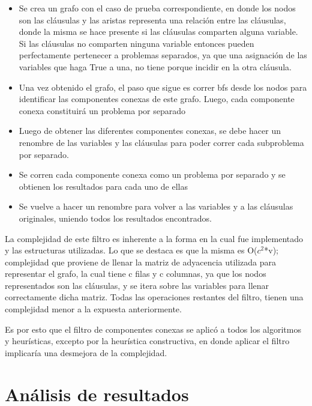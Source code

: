 \documentclass[a4paper,10pt]{article}
\begin{document}
\begin{itemize}
\item Se crea un grafo con el caso de prueba correspondiente, en donde los nodos son las cl\'ausulas y las aristas representa una relaci\'on entre las cl\'ausulas, donde la misma se hace presente si las cl\'ausulas comparten alguna variable. Si las cl\'ausulas no comparten ninguna variable entonces pueden perfectamente pertenecer a problemas separados, ya que una asignaci\'on de las variables que haga True a una, no tiene porque incidir en la otra cl\'ausula. 
\item Una vez obtenido el grafo, el paso que sigue es correr bfs desde los nodos para identificar las componentes conexas de este grafo. Luego, cada componente conexa constituir\'a un problema por separado
\item Luego de obtener las diferentes componentes conexas, se debe hacer un renombre de las variables y las cl\'ausulas para poder correr cada subproblema por separado.
\item Se corren cada componente conexa como un problema por separado y se obtienen los resultados para cada uno de ellas
\item Se vuelve a hacer un renombre para volver a las variables y a las cl\'ausulas originales, uniendo todos los resultados encontrados.
\end{itemize}

La complejidad de este filtro es inherente a la forma en la cual fue implementado y las estructuras utilizadas. Lo que se destaca es que la misma es O($c^2$*v); complejidad que proviene de llenar la matriz de adyacencia utilizada para representar el grafo, la cual tiene c filas y c columnas, ya que los nodos representados son las cl\'ausulas, y se itera sobre las variables para llenar correctamente dicha matriz. Todas las operaciones restantes del filtro, tienen una complejidad menor a la expuesta anteriormente.

Es por esto que el filtro de componentes conexas se aplic\'o a todos los algoritmos y heur\'isticas, excepto por la heur\'istica constructiva, en donde aplicar el filtro implicar\'ia una desmejora de la complejidad.



\section*{An\'alisis de resultados}
\end{document}
